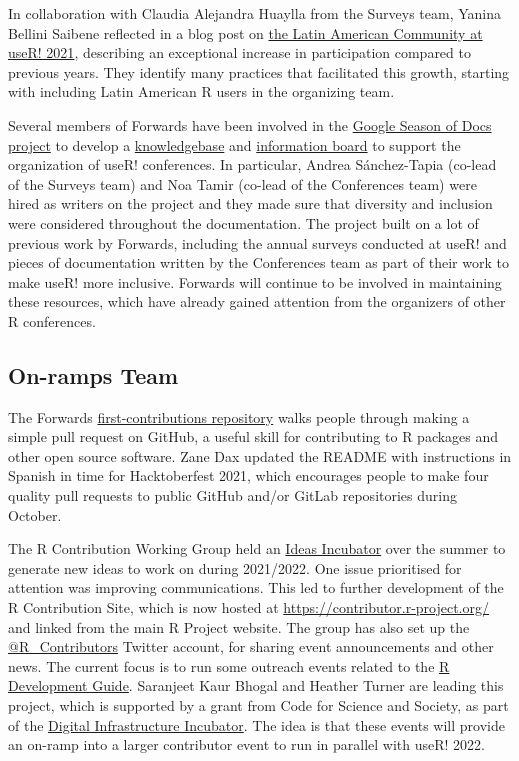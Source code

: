In collaboration with Claudia Alejandra Huaylla from the Surveys team, Yanina Bellini Saibene reflected in a blog post on \href{https://user2021.r-project.org/blog/2021/11/26/latines_at_user/}{the Latin American Community at useR! 2021}, describing an exceptional increase in participation compared to previous years. They identify many practices that facilitated this growth, starting with including Latin American R users in the organizing team.

Several members of Forwards have been involved in the \href{https://developers.google.com/season-of-docs/docs/participants}{Google Season of Docs project} to develop a \href{https://bit.ly/knowledgebase-rj}{knowledgebase} and \href{https://bit.ly/3fA5r61}{information board} to support the organization of useR! conferences. In particular, Andrea Sánchez-Tapia (co-lead of the Surveys team) and Noa Tamir (co-lead of the Conferences team) were hired as writers on the project and they made sure that diversity and inclusion were considered throughout the documentation. The project built on a lot of previous work by Forwards, including the annual surveys conducted at useR! and pieces of documentation written by the Conferences team as part of their work to make useR! more inclusive. Forwards will continue to be involved in maintaining these resources, which have already gained attention from the organizers of other R conferences.

\hypertarget{on-ramps-team}{%
\subsection{On-ramps Team}\label{on-ramps-team}}

The Forwards \href{https://github.com/forwards/first-contributions}{first-contributions repository} walks people through making a simple pull request on GitHub, a useful skill for contributing to R packages and other open source software. Zane Dax updated the README with instructions in Spanish in time for Hacktoberfest 2021, which encourages people to make four quality pull requests to public GitHub and/or GitLab repositories during October.

The R Contribution Working Group held an \href{https://github.com/r-devel/rcontribution/blob/main/ideas_incubator.md}{Ideas Incubator} over the summer to generate new ideas to work on during 2021/2022. One issue prioritised for attention was improving communications. This led to further development of the R Contribution Site, which is now hosted at \url{https://contributor.r-project.org/} and linked from the main R Project website. The group has also set up the \href{https://twitter.com/R_Contributors}{@R\_Contributors} Twitter account, for sharing event announcements and other news. The current focus is to run some outreach events related to the \href{https://contributor.r-project.org/rdevguide/}{R Development Guide}. Saranjeet Kaur Bhogal and Heather Turner are leading this project, which is supported by a grant from Code for Science and Society, as part of the \href{https://incubator.codeforscience.org/cohort}{Digital Infrastructure Incubator}. The idea is that these events will provide an on-ramp into a larger contributor event to run in parallel with useR! 2022.

